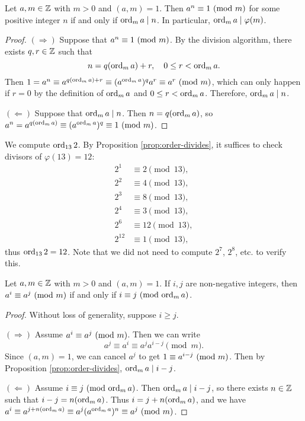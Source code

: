 \begin{prop}\label{prop:order-divides}
  Let $a, m \in \mathbb{Z}$ with $m > 0$ and
  $(a, m) = 1$. Then $a^n \equiv 1 \ (\mathrm{mod}\ m)$
  for some positive integer $n$ if and only
  if $\operatorname{ord}_m a \mid n$. In particular,
  $\operatorname{ord}_m a \mid \varphi(m)$.
\end{prop}

\begin{proof}
  $(\Rightarrow)$ Suppose that
  $a^n \equiv 1 \ (\mathrm{mod}\ m)$. By the
  division algorithm, there exists
  $q, r \in \mathbb{Z}$ such that
  \[
    n = q (\operatorname{ord}_m a) + r, \quad
    0 \le r < \operatorname{ord}_m a.
  \]
  Then $1 = a^n \equiv a^{q (\operatorname{ord}_m a) + r} \equiv (a^{\operatorname{ord}_m a})^q a^r \equiv a^r \ (\mathrm{mod}\ m)$,
  which can only happen if $r = 0$
  by the definition of $\operatorname{ord}_m a$
  and $0 \le r < \operatorname{ord}_m a$. Therefore,
  $\operatorname{ord}_m a \mid n$.

  $(\Leftarrow)$ Suppose that
  $\operatorname{ord}_m a \mid n$. Then $n = q (\operatorname{ord}_m a)$,
  so $a^n = a^{q (\operatorname{ord}_m a)} \equiv (a^{\operatorname{ord}_m a})^q \equiv 1 \ (\mathrm{mod}\ m)$.
\end{proof}

\begin{example}
  We compute $\operatorname{ord}_{13} 2$.
  By Proposition \ref{prop:order-divides},
  it suffices to check divisors
  of $\varphi(13) = 12$:
  \begin{align*}
    2^1 &\equiv 2 \pmod{13},\\
    2^2 &\equiv 4 \pmod{13},\\
    2^3 &\equiv 8 \pmod{13},\\
    2^4 &\equiv 3 \pmod{13},\\
    2^6 &\equiv 12 \pmod{13},\\
    2^{12} &\equiv 1 \pmod{13},
  \end{align*}
  thus $\operatorname{ord}_{13} 2 = 12$. Note that we
  did not need to compute $2^7$, $2^8$, etc.
  to verify this.
\end{example}

\begin{prop}\label{prop:order-congruence}
  Let $a, m \in \mathbb{Z}$ with $m > 0$ and
  $(a, m) = 1$. If $i, j$ are
  non-negative integers, then
  $a^i \equiv a^j \ (\mathrm{mod}\ m)$ if and only
  if $i \equiv j \ (\mathrm{mod}\ {\operatorname{ord}_m a})$.
\end{prop}

\begin{proof}
  Without loss of generality, suppose
  $i \ge j$.

  $(\Rightarrow)$ Assume
  $a^i \equiv a^j \ (\mathrm{mod}\ m)$. Then we can
  write
  \[
    a^j \equiv a^i \equiv a^j a^{i - j}
    \pmod{m}.
  \]
  Since $(a, m) = 1$, we can cancel
  $a^j$ to get
  $1 \equiv a^{i - j} \ (\mathrm{mod}\ m)$.
  Then by Proposition \ref{prop:order-divides},
  $\operatorname{ord}_m a \mid i - j$.

  $(\Leftarrow)$ Assume
  $i \equiv j \ (\mathrm{mod}\ {\operatorname{ord}_m a})$. Then
  $\operatorname{ord}_m a \mid i - j$, so there exists
  $n \in \mathbb{Z}$ such that $i - j = n (\operatorname{ord}_m a)$.
  Thus $i = j + n (\operatorname{ord}_m a)$, and we have
  $a^i \equiv a^{j + n (\operatorname{ord}_m a)} \equiv a^j (a^{\operatorname{ord}_m a})^n \equiv a^j \ (\mathrm{mod}\ m)$.
\end{proof}

